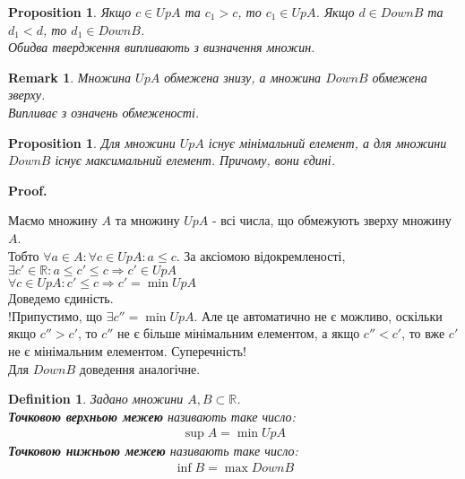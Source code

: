 \documentclass[a4paper, 14pt]{article}
\makeatletter
\def\qed{$\blacksquare$}
\theoremstyle{theoremdd}
\theoremstyle{theoremdd}
\newtheorem{definition}[theorem]{Definition}
\theoremstyle{theoremdd}
\theoremstyle{theoremdd}
\theoremstyle{theoremdd}
\newtheorem{proposition}[theorem]{Proposition}
\theoremstyle{theoremdd}
\newtheorem{remark}[theorem]{Remark}
\theoremstyle{theoremdd}
\theoremstyle{theoremdd}
\renewenvironment{proof}[1][Proof.\\]{\par
\pushQED{\hfill \qed}%
\normalfont \topsep6\p@\@plus6\p@\relax
\trivlist
\item\relax
{\bfseries
#1\@addpunct{.}}\hspace\labelsep\ignorespaces
}{%
\popQED\endtrivlist\@endpefalse
}
\makeatother
\begin{document}
	\begin{proposition}
	Якщо $c \in UpA$ та $c_1 > c$, то $c_1 \in UpA$.
	Якщо $d \in DownB$ та $d_1 < d$, то $d_1 \in DownB$.\\
	\textit{Обидва твердження випливають з визначення множин.}
	\end{proposition}
	
	\begin{remark}
	Множина $UpA$ обмежена знизу, а множина $DownB$ обмежена зверху.\\
	\textit{Випливає з означень обмеженості.}
	\end{remark}
	
	\begin{proposition}
	Для множини $UpA$ існує мінімальний елемент, а для множини $DownB$ існує максимальний елемент. Причому, вони єдині.
	\end{proposition}
	\begin{proof}
	Маємо множину $A$ та множину $UpA$ - всі числа, що обмежують зверху множину $A$.\\
	Тобто $\forall a \in A: \forall c \in UpA: a \leq c$. За аксіомою відокремленості, $\exists c' \in \mathbb{R}: a \leq c' \leq c \Rightarrow c' \in UpA$\\
	$\forall c \in UpA: c' \leq c \Rightarrow c' = \min UpA$\\
	Доведемо єдиність.\\
	!Припустимо, що $\exists c'' = \min UpA$.
	Але це автоматично не є можливо, оскільки якщо $c'' > c'$, то $c''$ не є більше мінімальним елементом, а якщо $c'' < c'$, то вже $c'$ не є мінімальним елементом. Суперечність!
	\bigskip \\
	Для $DownB$ доведення аналогічне.
	\end{proof}
	
	\begin{definition} Задано множини $A,B \subset \mathbb{R}$.\\
	\textbf{Точковою верхньою межею} називають таке число:
	\begin{align*}
	\sup A = \min UpA
	\end{align*}
	\textbf{Точковою нижньою межею} називають таке число:
	\begin{align*}
	\inf B = \max DownB
	\end{align*}
	\end{definition}
	
\end{document}
